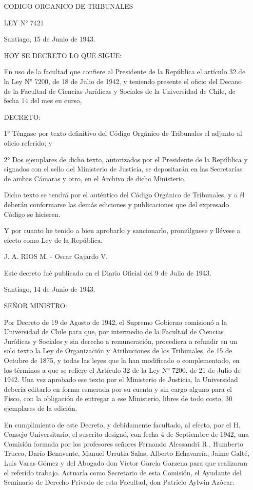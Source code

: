 CODIGO ORGANICO DE TRIBUNALES

    LEY N° 7421

    Santiago, 15 de Junio de 1943.

    HOY SE DECRETO LO QUE SIGUE:

    En uso de la facultad que confiere al Presidente de la República el artículo 32 de la Ley N° 7200, de 18 de Julio de 1942, y teniendo presente el oficio del Decano de la Facultad de Ciencias Jurídicas y Sociales de la Universidad de Chile, de fecha 14 del mes en curso,

    DECRETO:

    1° Téngase por texto definitivo del Código Orgánico de Tribunales el adjunto al oficio referido; y

    2° Dos ejemplares de dicho texto, autorizados por el Presidente de la República y signados con el sello del Ministerio de Justicia, se depositarán en las Secretarías de ambas Cámaras y otro, en el Archivo de dicho Ministerio.

    Dicho texto se tendrá por el auténtico del Código Orgánico de Tribunales, y a él deberán conformarse las demás ediciones y publicaciones que del expresado Código se hicieren.

    Y por cuanto he tenido a bien aprobarlo y sancionarlo, promúlguese y llévese a efecto como Ley de la República.

    J. A. RIOS M. - Oscar Gajardo V.

    Este decreto fué publicado en el Diario Oficial del 9 de Julio de 1943.

    Santiago, 14 de Junio de 1943.

SEÑOR MINISTRO:

    Por Decreto de 19 de Agosto de 1942, el Supremo Gobierno comisionó a la Universidad de Chile para que, por intermedio de la Facultad de Ciencias Jurídicas y Sociales y sin derecho a remuneración, procediera a refundir en un solo texto la Ley de Organización y Atribuciones de los Tribunales, de 15 de Octubre de 1875, y todas las leyes que la han modificado o complementado, en los términos a que se refiere el Artículo 32 de la Ley N° 7200, de 21 de Julio de 1942. Una vez aprobado ese texto por el Ministerio de Justicia, la Universidad debería editarlo en forma esmerada por su cuenta y sin cargo alguno para el Fisco, con la obligación de entregar a ese Ministerio, libres de todo costo, 30 ejemplares de la edición.

    En cumplimiento de este Decreto, y debidamente facultado, al efecto, por el H. Consejo Universitario, el suscrito designó, con fecha 4 de Septiembre de 1942, una Comisión formada por los profesores señores Fernando Alessandri R., Humberto Trucco, Darío Benavente, Manuel Urrutia Salas, Alberto Echavarría, Jaime Galté, Luis Varas Gómez y del Abogado don Víctor García Garzena para que realizaran el referido trabajo. Actuaría como Secretario de esta Comisión, el Ayudante del Seminario de Derecho Privado de esta Facultad, don Patricio Aylwin Azócar.

